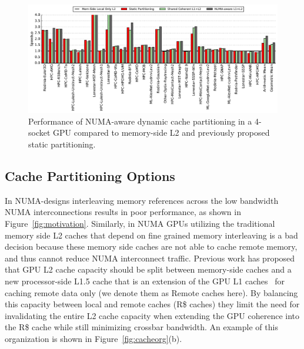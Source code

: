 \begin{figure}[t]
    \centering
    \includegraphics[width=1.0\textwidth]{figures/plot_merged_cache_WB.pdf}
    \caption{Performance of NUMA-aware dynamic cache partitioning in a 4-socket
	GPU compared to memory-side L2 and previously proposed static partitioning.}
    \label{fig:dynamiccaching}
        \vspace{-.2in}
\end{figure}

\subsection{Cache Partitioning Options}
In NUMA-designs interleaving memory references across the low bandwidth NUMA 
interconnections results in poor performance, as shown in 
Figure~\ref{fig:motivation}. Similarly, in NUMA GPUs utilizing the 
traditional memory side L2 caches that depend on fine grained memory 
interleaving is a bad decision because these memory side caches are not able 
to cache remote memory, and thus cannot reduce NUMA interconnect traffic.  
Previous work has proposed that GPU L2 cache capacity should be split between 
memory-side caches and a new processor-side L1.5 cache that is an extension 
of the GPU L1 caches~\cite{Arunkumar2017} for caching remote data only (we 
denote them as Remote caches here). By balancing this capacity between local 
and remote caches (R\$ caches) they limit the need for invalidating the entire 
L2 cache capacity when extending the GPU coherence into the R\$ cache while still 
minimizing crossbar bandwidth. An example of this organization is shown in 
Figure~\ref{fig:cacheorg}(b). 

